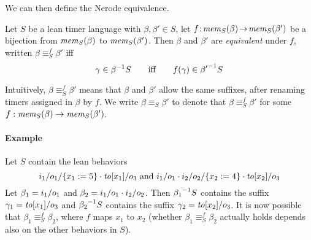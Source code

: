 We can then define the Nerode equivalence.

\begin{definition}
  \label{def:bj-nerode}
Let $S$ be a lean timer language with $\beta,\beta'\in S$,
let $f \!:\! \getmemorable{S}{\beta}\! \to\! \getmemorable{S}{\beta'}$
be a bijection
from $\getmemorable{S}{\beta}$ to $\getmemorable{S}{\beta'}$.
Then $\beta$ and $\beta'$ are \emph{equivalent} under $f$, written
$\beta \equiv_{S}^f \beta'$ iff
\[
\gamma \in \suffixbehs{S}{\beta}
\qquad \mbox{iff} \qquad
f(\gamma) \in \suffixbehs{S}{\beta'}
\]
\end{definition}
Intuitively, $\beta \equiv_{S}^f \beta'$ means that $\beta$ and $\beta'$
allow the same suffixes, after renaming
timers assigned in $\beta$ by $f$.
We write $\beta \equiv_{S} \beta'$ to denote that
$\beta \equiv_{S}^f \beta'$ for some
$f : \getmemorable{S}{\beta} \to \getmemorable{S}{\beta'}$.

\paragraph{Example} Let $S$ contain the lean behaviors
\[
\utlabel{i_1}{o_1}{\set{x_1:=5}} \cdot \simpleutlabel{\toevent{x_1}}{o_3}
\mbox{ and }
\simpleutlabel{i_1}{o_1} \cdot \utlabel{i_2}{o_2}{\set{x_2:=4}} \cdot \simpleutlabel{\toevent{x_2}}{o_3}
\]
Let $\beta_1 = \simpleutlabel{i_1}{o_1}$ and
$\beta_2 = \simpleutlabel{i_1}{o_1} \cdot \simpleutlabel{i_2}{o_2}$.
Then $\suffixbehs{S}{\beta_1}$ contains the suffix
$\gamma_1 = \simpleutlabel{\toevent{x_1}}{o_3}$ and
$\suffixbehs{S}{\beta_2}$ contains the suffix
$\gamma_2 = \simpleutlabel{\toevent{x_2}}{o_3}$.
It is now possible that
$\beta_1 \equiv_S^f \beta_2$, where $f$ maps $x_1$ to $x_2$ (whether
$\beta_1 \equiv_S^f \beta_2$ actually holds depends also on the other
behaviors in $S$).



